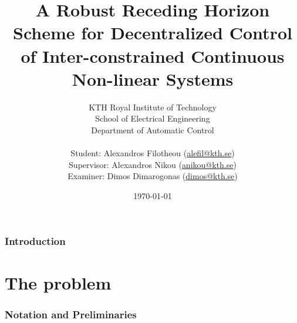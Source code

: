 \documentclass[a4paper,10pt,twoside]{article}
\title{\textbf{
A Robust Receding Horizon Scheme for Decentralized Control of Inter-constrained
Continuous Non-linear Systems}}
\author{KTH Royal Institute of Technology \\
  School of Electrical Engineering \\
  Department of Automatic Control \\ \\
Student: Alexandros Filotheou (\href{mailto: alefil@kth.se}{alefil@kth.se}) \\
Supervisor: Alexandros Nikou (\href{mailto: anikou@kth.se}{anikou@kth.se}) \\
Examiner: Dimos Dimarogonas (\href{mailto: dimos@kth.se}{dimos@kth.se}) \\}
\date{\today}
\begin{document}
\maketitle


\cleardoublepage
\tableofcontents
\cleardoublepage


\section{Introduction}

  
  \cleardoublepage

\part{The problem}
\cleardoublepage

  \section{Notation and Preliminaries}
    \label{sec:notation_reliminaries}

    
    
    
    \cleardoublepage
\end{document}
